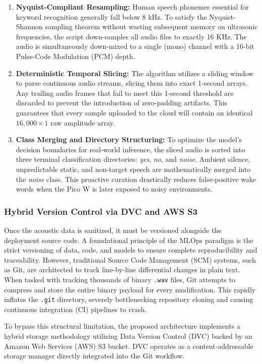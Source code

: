 \documentclass[11pt,a4paper,openany]{book}
\begin{document}
\begin{enumerate}
    \item \textbf{Nyquist-Compliant Resampling:} Human speech phonemes essential for keyword recognition generally fall below 8 kHz. To satisfy the Nyquist-Shannon sampling theorem without wasting subsequent memory on ultrasonic frequencies, the script down-samples all audio files to exactly 16 KHz. The audio is simultaneously down-mixed to a single (mono) channel with a 16-bit Pulse-Code Modulation (PCM) depth.
    \item \textbf{Deterministic Temporal Slicing:} The algorithm utilizes a sliding window to parse continuous audio streams, slicing them into exact 1-second arrays. Any trailing audio frames that fail to meet this 1-second threshold are discarded to prevent the introduction of zero-padding artifacts. This guarantees that every sample uploaded to the cloud will contain an identical $16,000 \times 1$ raw amplitude array.
    \item \textbf{Class Merging and Directory Structuring:} To optimize the model's decision boundaries for real-world inference, the sliced audio is sorted into three terminal classification directories: \textit{yes}, \textit{no}, and \textit{noise}. Ambient silence, unpredictable static, and non-target speech are mathematically merged into the \textit{noise} class. This proactive curation drastically reduces false-positive wake words when the Pico W is later exposed to noisy environments.
\end{enumerate}

\subsubsection{Hybrid Version Control via DVC and AWS S3}
Once the acoustic data is sanitized, it must be versioned alongside the deployment source code. A foundational principle of the MLOps paradigm is the strict versioning of data, code, and models to ensure complete reproducibility and traceability. However, traditional Source Code Management (SCM) systems, such as Git, are architected to track line-by-line differential changes in plain text. When tasked with tracking thousands of binary \texttt{.wav} files, Git attempts to compress and store the entire binary payload for every modification. This rapidly inflates the \texttt{.git} directory, severely bottlenecking repository cloning and causing continuous integration (CI) pipelines to crash.

To bypass this structural limitation, the proposed architecture implements a hybrid storage methodology utilizing Data Version Control (DVC) backed by an Amazon Web Services (AWS) S3 bucket. DVC operates as a content-addressable storage manager directly integrated into the Git workflow.
\end{document}
